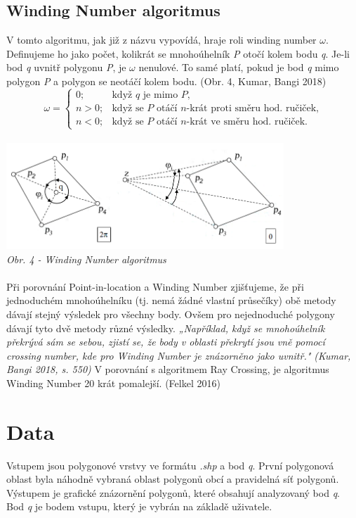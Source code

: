\documentclass{article}
\begin{document}
\subsection{\small{Winding Number algoritmus}}
V tomto algoritmu, jak již z názvu vypovídá, hraje roli winding number $\omega$. Definujeme ho jako počet,  kolikrát se mnohoúhelník \emph{P} otočí kolem bodu \emph{q}. Je-li bod \emph{q} uvnitř polygonu \emph{P}, je $\omega$ nenulové. To samé platí, pokud je bod \emph{q} mimo polygon \emph{P} a polygon se neotáčí kolem bodu. (Obr. 4, Kumar, Bangi 2018)
\begin{equation}
    \omega = \begin{cases}
            0; & \text{když $q$ je mimo $P,$}\\
            n > 0; & \text{když se $P$ otáčí $n$-krát proti směru hod. ručiček,}\\
            n < 0; & \text{když se $P$ otáčí $n$-krát ve směru hod. ručiček.}
    \end{cases}
\end{equation}
\vspace{0.2cm}\\
\includegraphics[height=40mm]{images/winding_number.PNG}\bigskip\\
\textit{\footnotesize{Obr. 4 - Winding Number algoritmus}}\\
\vspace{0.2cm}\\
Při porovnání Point-in-location a Winding Number zjišťujeme, že při jednoduchém mnohoúhelníku (tj. nemá žádné vlastní průsečíky) obě metody dávají stejný výsledek pro všechny body. Ovšem pro nejednoduché polygony dávají tyto dvě metody různé výsledky. \textit{„Například, když se mnohoúhelník překrývá sám se sebou, zjistí se, že body v oblasti překrytí jsou vně pomocí crossing number, kde pro Winding Number je znázorněno jako uvnitř." (Kumar, Bangi 2018, s. 550)} V porovnání s algoritmem Ray Crossing, je algoritmus Winding Number 20 krát pomalejší. (Felkel 2016)
\section{\large{Data}}
Vstupem jsou polygonové vrstvy ve formátu \emph{.shp} a bod \emph{q}. První polygonová oblast byla náhodně vybraná oblast polygonů obcí a pravidelná síť polygonů. Výstupem je grafické znázornění polygonů, které obsahují analyzovaný bod \emph{q}. Bod \emph{q} je bodem vstupu, který je vybrán na základě uživatele.
\end{document}
